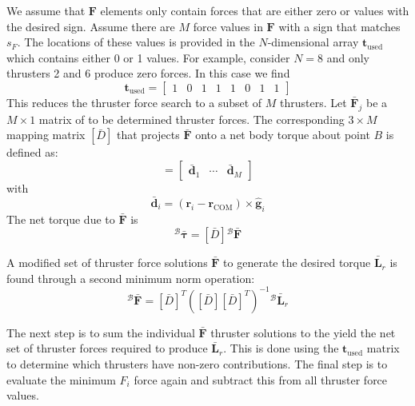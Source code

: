 We assume that $\bm F$ elements only contain forces that are either zero or values with the desired sign.   Assume there are $M$  force values in $\bm F$ with a sign that matches $s_{F}$.  The locations of these values is provided in the $N$-dimensional array $\bm t_{\text{used}}$ which contains either 0 or 1 values.  For example, consider $N=8$ and only thrusters 2 and 6 produce  zero forces. In this case we find
\begin{equation}
	\bm t_{\text{used}} = \begin{bmatrix}
		1 & 0 & 1 & 1 & 1 & 0 & 1 & 1
	\end{bmatrix}
\end{equation}
This reduces the thruster force search to a subset of $M$ thrusters.  Let $\bar{\bm F}_{j}$ be a $M\times 1$ matrix of to be determined thruster forces.  The corresponding $3\times M$ mapping matrix $[\bar D]$ that projects $\bar{\bm F}$ onto a net body torque about point $B$ is defined as:
\begin{equation}
	[\bar D] = \begin{bmatrix} \bar{\bm d}_{1} & \cdots & \bar{\bm d}_{M} \end{bmatrix}
\end{equation}
with
\begin{equation}
	\bar{\bm d}_{i} = (\bm r_{i} - \bm r_{\text{COM}}) \times \hat{\bm g}_{i}
\end{equation}
The net torque due to $\bar{\bm F}$ is
\begin{equation}
	{}^{\mathcal{B}}\bar{\bm \tau} = [\bar D] {}^{\mathcal{B}}\bar{\bm F}
\end{equation}

A modified set of thruster force solutions $\bar{\bm F}$ to generate the desired torque $\bar{\bm L}_{r}$ is found through a second minimum norm operation:
\begin{equation}
	\label{eq:th:min2}
	{}^{\mathcal{B}}\bar{\bm F} = [\bar D]^{T}([\bar D][\bar D]^{T})^{-1} {}^{\mathcal{B}}\bar{\bm L}_{r}
\end{equation}




The next step is to sum the individual $\bar{\bm F}$ thruster solutions to the yield the net set of thruster forces required to produce $\bar{\bm L}_{r}$.  This is done using the  $\bm t_{\text{used}}$ matrix to determine which thrusters have non-zero contributions.   The final step is to evaluate the minimum $F_{i}$ force again and subtract this from all thruster force values.




